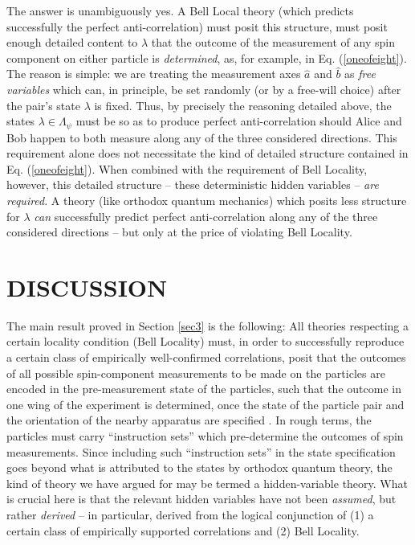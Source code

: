 \documentclass[aps,prc,onecolumn,12pt,nofootinbib]{revtex4-2}
\begin{document}
The answer is unambiguously yes.  A Bell Local theory (which predicts
successfully the perfect anti-correlation) must posit this structure,
must posit enough detailed content to $\lambda$ that the outcome of
the measurement of any spin component on either particle is
\emph{determined}, as, for example, in Eq. (\ref{oneofeight}).  The
reason is simple:  we are treating the measurement axes $\hat{a}$ and
$\hat{b}$ as \emph{free variables} which can, in principle, be set
randomly (or by a free-will choice) after the pair's state $\lambda$
is fixed.  Thus, by precisely the reasoning detailed above, the states
$\lambda \in  \Lambda_\psi $ must be so as to produce perfect
anti-correlation should Alice and Bob happen to both measure along any
of the three considered directions.  This requirement alone does not
necessitate the kind of detailed structure contained in
Eq. (\ref{oneofeight}).  When combined with the requirement of Bell
Locality, however, this detailed structure -- these deterministic
hidden variables -- \emph{are required}.  A theory (like
orthodox quantum mechanics) which posits less structure for
$\lambda$ \emph{can}
successfully predict perfect anti-correlation along any of the three
considered directions -- but only at the price of violating Bell Locality.


\section{DISCUSSION}
\label{sec4}


The main result proved in Section \ref{sec3}
is the following:  All theories
respecting a certain locality condition (Bell Locality) must, in order
to successfully reproduce a certain class of empirically
well-confirmed correlations, posit that the outcomes of all
possible spin-component measurements to be made on the particles are
encoded in the pre-measurement state of the particles, such that the
outcome in one wing of the experiment is determined, once the
state of the particle pair and the orientation of the nearby apparatus
are specified \cite{fine}.
In rough terms, the particles must carry ``instruction
sets'' \cite{instructionsets}
which pre-determine the outcomes of spin measurements.  Since
including such ``instruction sets'' in the state specification goes
beyond what is attributed to the states by orthodox quantum theory,
the kind of theory we have argued for may be termed a hidden-variable
theory.  What is crucial here is that the relevant hidden variables
have not been \emph{assumed}, but rather \emph{derived} -- in
particular, derived from the logical conjunction of (1)
a certain class of empirically supported correlations and
(2) Bell Locality.
\end{document}
